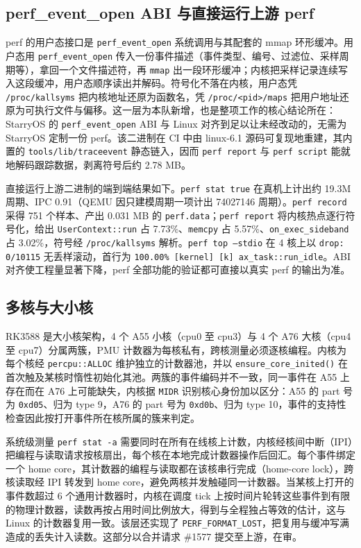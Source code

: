 \subsection{perf\_event\_open ABI 与直接运行上游 perf}

perf 的用户态接口是 \texttt{perf\_event\_open} 系统调用与其配套的 mmap 环形缓冲。用户态用 \texttt{perf\_event\_open} 传入一份事件描述（事件类型、编号、过滤位、采样周期等），拿回一个文件描述符，再 \texttt{mmap} 出一段环形缓冲；内核把采样记录连续写入这段缓冲，用户态顺序读出并解码。符号化不落在内核，用户态凭 \texttt{/proc/kallsyms} 把内核地址还原为函数名，凭 \texttt{/proc/<pid>/maps} 把用户地址还原为可执行文件与偏移。这一层为本队新增，也是整项工作的核心结论所在：StarryOS 的 \texttt{perf\_event\_open} ABI 与 Linux 对齐到足以让未经改动的，无需为 StarryOS 定制一份 perf。该二进制在 CI 中由 linux-6.1 源码可复现地重建，其内置的 \texttt{tools/lib/traceevent} 静态链入，因而 \texttt{perf report} 与 \texttt{perf script} 能就地解码跟踪数据，剥离符号后约 2.78 MB。

直接运行上游二进制的端到端结果如下。\texttt{perf stat true} 在真机上计出约 19.3M 周期、IPC 0.91（QEMU 因只建模周期一项计出 74027146 周期）。\texttt{perf record} 采得 751 个样本、产出 0.031 MB 的 \texttt{perf.data}；\texttt{perf report} 将内核热点逐行符号化，给出 \texttt{UserContext::run} 占 7.73\%、\texttt{memcpy} 占 5.57\%、\texttt{on\_exec\_sideband} 占 3.02\%，符号经 \texttt{/proc/kallsyms} 解析。\texttt{perf top --stdio} 在 4 核上以 \texttt{drop: 0/10115} 无丢样滚动，首行为 \texttt{100.00\% [kernel] [k] ax\_task::run\_idle}。ABI 对齐使工程量显著下降，perf 全部功能的验证都可直接以真实 perf 的输出为准。

\subsection{多核与大小核}

RK3588 是大小核架构，4 个 A55 小核（cpu0 至 cpu3）与 4 个 A76 大核（cpu4 至 cpu7）分属两簇，PMU 计数器为每核私有，跨核测量必须逐核编程。内核为每个核经 \texttt{percpu::ALLOC} 维护独立的计数器池，并以 \texttt{ensure\_core\_inited()} 在首次触及某核时惰性初始化其池。两簇的事件编码并不一致，同一事件在 A55 上存在而在 A76 上可能缺失，内核据 \texttt{MIDR} 识别核心身份加以区分：A55 的 part 号为 \texttt{0xd05}、归为 type 9，A76 的 part 号为 \texttt{0xd0b}、归为 type 10，事件的支持性检查因此按打开事件所在核所属的簇来判定。

系统级测量 \texttt{perf stat -a} 需要同时在所有在线核上计数，内核经核间中断（IPI）把编程与读取请求按核扇出，每个核在本地完成计数器操作后回汇。每个事件绑定一个 home core，其计数器的编程与读取都在该核串行完成（home-core lock），跨核读取经 IPI 转发到 home core，避免两核并发触碰同一计数器。当某核上打开的事件数超过 6 个通用计数器时，内核在调度 tick 上按时间片轮转这些事件到有限的物理计数器，读数再按占用时间比例放大，得到与全程独占等效的估计，这与 Linux 的计数器复用一致。该层还实现了 \texttt{PERF\_FORMAT\_LOST}，把复用与缓冲写满造成的丢失计入读数。这部分以合并请求 \#1577 提交至上游，在审。

